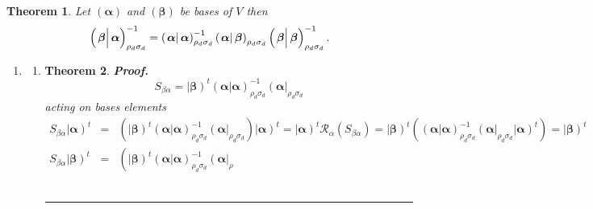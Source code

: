 \documentclass[aps,preprint]{revtex4}
\newtheorem{theorem}{Theorem}
\newenvironment{proof}[1][Proof]{\noindent\textbf{#1.} }{\ \rule{0.5em}{0.5em}}
\begin{document}
\begin{theorem}
Let $\left( \boldsymbol{\alpha }\right) $ and $\left( \boldsymbol{\beta }%
\right) $ be bases of $V$ then 
\begin{equation}
\left( \left. \overset{}{\boldsymbol{\beta }}\right\vert \boldsymbol{\alpha }%
\right) _{\rho _{d}\sigma _{d}}^{-1}=\left( \left. \overset{}{\boldsymbol{%
\alpha }}\right\vert \boldsymbol{\alpha }\right) _{\rho _{d}\sigma
_{d}}^{-1}\left( \left. \overset{}{\boldsymbol{\alpha }}\right\vert 
\boldsymbol{\beta }\right) _{\rho _{d}\sigma _{d}}\left( \left. \overset{}{%
\boldsymbol{\beta }}\right\vert \boldsymbol{\beta }\right) _{\rho _{d}\sigma
_{d}}^{-1}.
\end{equation}
\end{theorem}

\begin{enumerate}
\item 
\begin{enumerate}
\item 
\begin{theorem}
\begin{proof}
\begin{equation}
S_{\beta \alpha }=\left\vert \boldsymbol{\beta }\right) ^{t}\left( \left. 
\boldsymbol{\alpha }\right\vert \boldsymbol{\alpha }\right) _{\rho
_{d}\sigma _{d}}^{-1}\left( \boldsymbol{\alpha }\right\vert _{\rho
_{d}\sigma _{d}}
\end{equation}%
acting on bases elements 
\begin{eqnarray}
S_{\beta \alpha }\left\vert \boldsymbol{\alpha }\right) ^{t} &=&\left( 
\overset{}{\left\vert \boldsymbol{\beta }\right) ^{t}\left( \left. 
\boldsymbol{\alpha }\right\vert \boldsymbol{\alpha }\right) _{\rho
_{d}\sigma _{d}}^{-1}\left( \boldsymbol{\alpha }\right\vert _{\rho
_{d}\sigma _{d}}}\right) \left\vert \boldsymbol{\alpha }\right)
^{t}=\left\vert \boldsymbol{\alpha }\right) ^{t}\mathcal{R}_{\alpha }\left(
S_{\beta \alpha }\right) =\left\vert \boldsymbol{\beta }\right) ^{t}\left( 
\overset{}{\left( \left. \boldsymbol{\alpha }\right\vert \boldsymbol{\alpha }%
\right) _{\rho _{d}\sigma _{d}}^{-1}\left( \boldsymbol{\alpha }\right\vert
_{\rho _{d}\sigma _{d}}\left\vert \boldsymbol{\alpha }\right) ^{t}}\right)
=\left\vert \boldsymbol{\beta }\right) ^{t} \\
S_{\beta \alpha }\left\vert \boldsymbol{\beta }\right) ^{t} &=&\left( 
\overset{}{\left\vert \boldsymbol{\beta }\right) ^{t}\left( \left. 
\boldsymbol{\alpha }\right\vert \boldsymbol{\alpha }\right) _{\rho
_{d}\sigma _{d}}^{-1}\left( \boldsymbol{\alpha }\right\vert _{\rho
}}
\end{eqnarray}
\end{proof}
\end{theorem}
\end{enumerate}
\end{enumerate}
\end{document}

